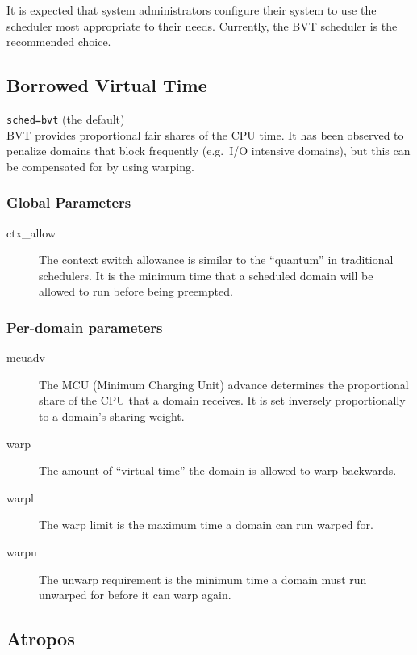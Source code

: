 It is expected that system administrators configure their system to
use the scheduler most appropriate to their needs.  Currently, the BVT
scheduler is the recommended choice.

\subsection{Borrowed Virtual Time}

{\tt sched=bvt} (the default) \\

BVT provides proportional fair shares of the CPU time.  It has been
observed to penalize domains that block frequently (e.g.\ I/O
intensive domains), but this can be compensated for by using warping.

\subsubsection{Global Parameters}

\begin{description}
\item[ctx\_allow] The context switch allowance is similar to the
  ``quantum'' in traditional schedulers.  It is the minimum time that
  a scheduled domain will be allowed to run before being preempted.
\end{description}

\subsubsection{Per-domain parameters}

\begin{description}
\item[mcuadv] The MCU (Minimum Charging Unit) advance determines the
  proportional share of the CPU that a domain receives.  It is set
  inversely proportionally to a domain's sharing weight.
\item[warp] The amount of ``virtual time'' the domain is allowed to
  warp backwards.
\item[warpl] The warp limit is the maximum time a domain can run
  warped for.
\item[warpu] The unwarp requirement is the minimum time a domain must
  run unwarped for before it can warp again.
\end{description}

\subsection{Atropos}


